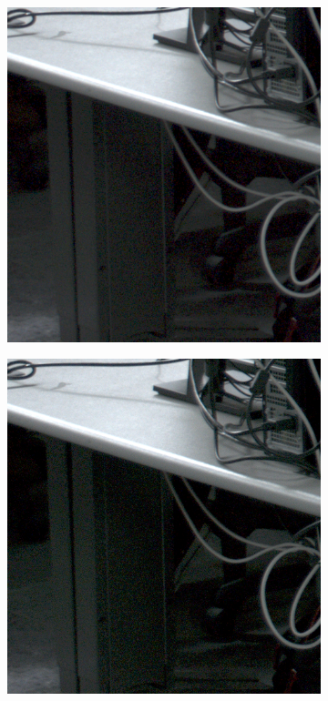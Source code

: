 \documentclass[a4paper,oneside]{article}
\begin{document}
\begin{figure}[htbp]
  \centering
  \begin{subfigure}{.33\textwidth}
  \centering
  \includegraphics[width=.95\linewidth]{demosaic_students2_detail}
  \caption{}
\end{subfigure}%
\begin{subfigure}{.33\textwidth}
  \centering
  \includegraphics[width=.95\linewidth]{matlab_demosaic_students2_detail}

\end{subfigure}
\end{figure}
\end{document}

